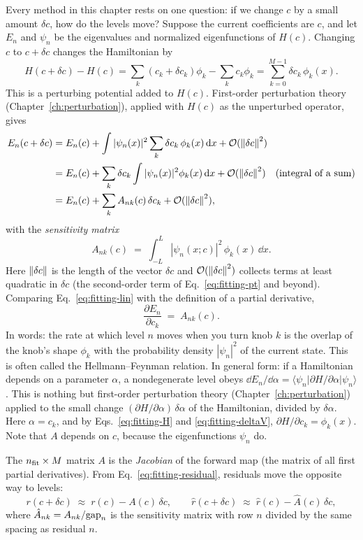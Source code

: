 Every method in this chapter rests on one question: if we change $c$ by a small amount $\delta c$, how do the levels move? Suppose the current coefficients are $c$, and let $E_n$ and $\psi_n$ be the eigenvalues and normalized eigenfunctions of $H(c)$. Changing $c$ to $c+\delta c$ changes the Hamiltonian by
\[
H(c+\delta c)-H(c)=\sum_k(c_k+\delta c_k)\phi_k-\sum_kc_k\phi_k=\sum_{k=0}^{M-1}\delta c_k\,\phi_k(x).
\]
This is a perturbing potential added to $H(c)$. First-order perturbation theory (Chapter~\ref{ch:perturbation}), applied with $H(c)$ as the unperturbed operator, gives
\begin{align}
E_n(c+\delta c) &= E_n(c)+\int|\psi_n(x)|^2\sum_k\delta c_k\,\phi_k(x)\,\mathrm{d} x+\mathcal{O}(\left\lVert \delta c\right\rVert^2) \nonumber\\
&= E_n(c)+\sum_k\delta c_k\int|\psi_n(x)|^2\phi_k(x)\,\mathrm{d} x+\mathcal{O}(\left\lVert \delta c\right\rVert^2)\quad\text{(integral of a sum)}\nonumber\\
&= E_n(c)+\sum_kA_{nk}(c)\,\delta c_k+\mathcal{O}(\left\lVert \delta c\right\rVert^2),
\label{eq:fitting-lin}
\end{align}
with the \emph{sensitivity matrix}
\begin{equation}
A_{nk}(c) \;=\; \int_{-L}^{L}|\psi_n(x;c)|^2\,\phi_k(x)\,\dd x .
\label{eq:fitting-A}
\end{equation}
Here $\left\lVert \delta c\right\rVert$ is the length of the vector $\delta c$ and $\mathcal{O}(\left\lVert \delta c\right\rVert^2)$ collects terms at least quadratic in $\delta c$ (the second-order term of Eq.~\eqref{eq:fitting-pt} and beyond). Comparing Eq.~\eqref{eq:fitting-lin} with the definition of a partial derivative,
\[
\frac{\partial E_n}{\partial c_k} \;=\; A_{nk}(c).
\]
In words: the rate at which level $n$ moves when you turn knob $k$ is the overlap of the knob's shape $\phi_k$ with the probability density $|\psi_n|^2$ of the current state. This is often called the Hellmann--Feynman relation. In general form: if a Hamiltonian depends on a parameter $\alpha$, a nondegenerate level obeys $\dd E_n/\dd\alpha=\langle\psi_n|\partial H/\partial\alpha|\psi_n\rangle$. This is nothing but first-order perturbation theory (Chapter~\ref{ch:perturbation}) applied to the small change $(\partial H/\partial\alpha)\,\delta\alpha$ of the Hamiltonian, divided by $\delta\alpha$. Here $\alpha=c_k$, and by Eqs.~\eqref{eq:fitting-H} and \eqref{eq:fitting-deltaV}, $\partial H/\partial c_k=\phi_k(x)$. Note that $A$ depends on $c$, because the eigenfunctions $\psi_n$ do.

The $n_{\rm fit}\times M$ matrix $A$ is the \emph{Jacobian} of the forward map (the matrix of all first partial derivatives). From Eq.~\eqref{eq:fitting-residual}, residuals move the opposite way to levels:
\begin{equation}
r(c+\delta c)\;\approx\;r(c)-A(c)\,\delta c, \qquad \hat r(c+\delta c)\;\approx\;\hat r(c)-\hat A(c)\,\delta c,
\label{eq:fitting-rlin}
\end{equation}
where $\hat A_{nk}=A_{nk}/\mathrm{gap}_n$ is the sensitivity matrix with row $n$ divided by the same spacing as residual $n$.

